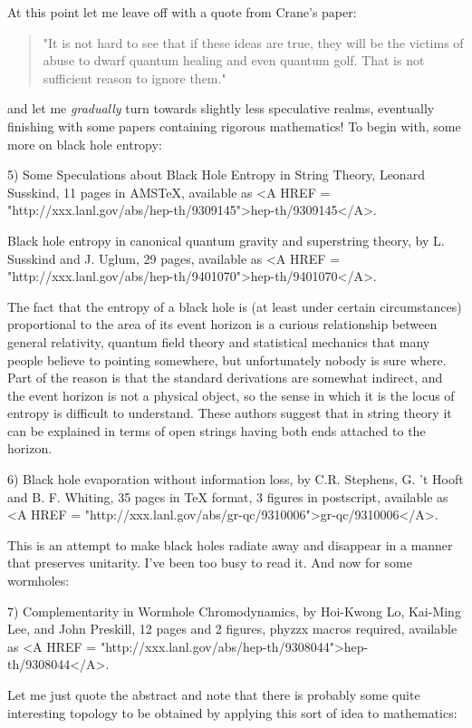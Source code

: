 At this point let me leave off with a quote from Crane's paper:

\begin{quote}
"It is not hard to see that if these ideas are true, they will be the
victims of abuse to dwarf quantum healing and even quantum golf. That
is not sufficient reason to ignore them."
\end{quote}
    

and let me \emph{gradually} turn towards slightly less speculative realms,
eventually finishing with some papers containing rigorous mathematics!
To begin with, some more on black hole entropy:

5)  Some Speculations about Black Hole Entropy in String Theory,
Leonard Susskind, 11 pages in AMSTeX, available as <A HREF = "http://xxx.lanl.gov/abs/hep-th/9309145">hep-th/9309145</A>.

Black hole entropy in canonical quantum gravity and superstring
theory, by L. Susskind and J. Uglum, 29 pages, available as <A HREF = "http://xxx.lanl.gov/abs/hep-th/9401070">hep-th/9401070</A>.

The fact that the entropy of a black hole is (at least under certain
circumstances) proportional to the area of its event horizon is a
curious relationship between general relativity, quantum field theory
and statistical mechanics that many people believe to pointing
somewhere, but unfortunately nobody is sure where.  Part of the reason
is that the standard derivations are somewhat indirect, and the event
horizon is not a physical object, so the sense in which it is the locus
of entropy is difficult to understand.  These authors suggest that in
string theory it can be explained in terms of open strings having both
ends attached to the horizon.  

6) Black hole evaporation without information loss, by C.R. Stephens, G.
't Hooft and B. F. Whiting, 35 pages in TeX format, 3 figures in
postscript, available as <A HREF = "http://xxx.lanl.gov/abs/gr-qc/9310006">gr-qc/9310006</A>.  

This is an attempt to make black holes radiate away and disappear
in a manner that preserves unitarity.  I've been too busy to read it.
And now for some wormholes:

7) Complementarity in Wormhole Chromodynamics, by Hoi-Kwong Lo, Kai-Ming
Lee, and John Preskill, 12 pages and 2 figures, phyzzx macros required,
available as <A HREF = "http://xxx.lanl.gov/abs/hep-th/9308044">hep-th/9308044</A>.

Let me just quote the abstract and note that there is probably some quite
interesting topology to be obtained by applying this sort of idea to
mathematics:

